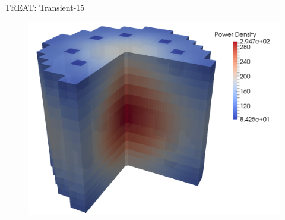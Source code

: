 \documentclass[8pt,xcolor=dvipnames]{beamer}
\begin{document}
\begin{frame}{TREAT: Transient-15}

\begin{figure}[h]
\centering
\includegraphics[height=0.9\textheight]{figures/Tran15_core2.png}
\end{figure}

\end{frame}
\end{document}
